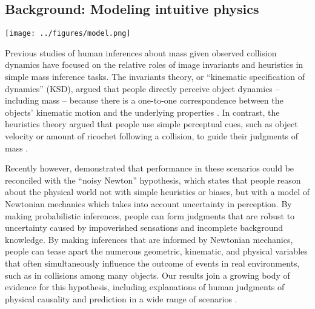 \documentclass[10pt,letterpaper]{article}
\newcommand{\rand}[1]{random-order #1}
\begin{document}
\subsection{Background: Modeling intuitive physics}

\begin{figure*}[t]
  \begin{center}
    \texttt{[image: ../figures/model.png]}
    \caption{\small (A) An example of how different values of $r_0$
      can affect the outcome, $q(G^\prime, G)$. In this case, if
      $r_0=10$, then the yellow blocks counterbalance the red ones and
      the tower is precariously stable. If $r_0=0.1$, then the red
      blocks cause the tower to topple over. (B) The ideal observer
      model's posterior distribution over mass ratio, $P(r|K_t)$ for
      each text feedback condition and trial ordering used in the
      experiment. As expected, the ideal observer converges on the
      correct end of the spectrum. Note that trial ordering can
      significantly delay learning, however, as is the case for the
      \rand{} with $r_0=0.1$ feedback.}
    \label{fig:model}
  \end{center}
\end{figure*}

Previous studies of human inferences about mass given observed
collision dynamics have focused on the relative roles of image
invariants and heuristics in simple mass inference tasks. The
invariants theory, or ``kinematic specification of dynamics'' (KSD),
argued that people directly perceive object dynamics -- including mass
-- because there is a one-to-one correspondence between the objects'
kinematic motion and the underlying properties \cite{Runeson2000}. In
contrast, the heuristics theory argued that people use simple
perceptual cues, such as object velocity or amount of ricochet
following a collision, to guide their judgments of mass
\cite{Todd1982,Gilden1994}.

Recently however,  demonstrated that performance in
these scenarios could be reconciled with the ``noisy Newton''
hypothesis, which states that people reason about the physical world
not with simple heuristics or biases, but with a model of Newtonian
mechanics which takes into account uncertainty in perception. By
making probabilistic inferences, people can form judgments that are
robust to uncertainty caused by impoverished sensations and incomplete
background knowledge. By making inferences that are informed by
Newtonian mechanics, people can tease apart the numerous geometric,
kinematic, and physical variables that often simultaneously influence
the outcome of events in real environments, such as in collisions
among many objects. Our results join a growing body of evidence for
this hypothesis, including explanations of human judgments of physical
causality and prediction in a wide range of scenarios
\cite{Sanborn2013,Hamrick2011,Smith2012,Gerstenberg2012}.
\end{document}
